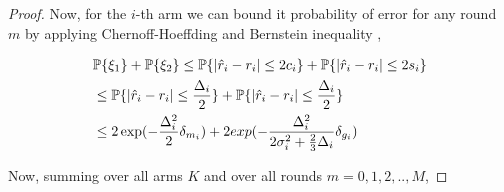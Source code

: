 \begin{proof}


Now, for the $i$-th arm we can bound it probability of error for any round $m$ by applying Chernoff-Hoeffding and Bernstein inequality ,
\begin{small}
\begin{align*}
& \mathbb{P}\lbrace \xi_1\rbrace  + \mathbb{P}\lbrace \xi_2 \rbrace \leq \mathbb{P}\lbrace |\hat{r}_i -r_i| \leq 2c_i \rbrace + \mathbb{P}\lbrace |\hat{r}_i -r_i| \leq 2s_i \rbrace\\ 
&\leq \mathbb{P}\lbrace |\hat{r}_i - r_i| \leq \frac{\Delta_i}{2} \rbrace + \mathbb{P}\lbrace |\hat{r}_i - r_i| \leq \frac{\Delta_i}{2} \rbrace \\
&\leq 2\exp( -\frac{\Delta_{i}^{2}}{2}\delta_{m_{i}} ) + 2exp(- \frac{\Delta_{i}^{2}}{2\sigma_{i}^{2}+ \frac{2}{3}\Delta_i}\delta_{g_{i}})
\end{align*}
\end{small}

Now, summing over all arms $K$ and over all rounds $m=0,1,2,..,M$,


\end{proof}
